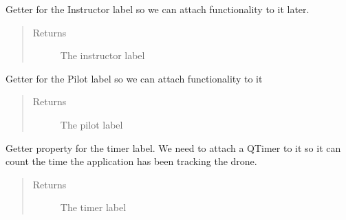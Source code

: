 \documentclass[letterpaper,10pt,english]{sphinxmanual}
\begin{document}
\begin{fulllineitems}
\begin{fulllineitems}
\begin{quote}
\begin{description}
\end{description}\end{quote}

\end{fulllineitems}


\begin{fulllineitems}
\label{\detokenize{index:src.Views.View_TrackingScreen.TrackingWindow.LblInstructor}}
Getter for the Instructor label so we can attach functionality to it later.
\begin{quote}\begin{description}
\item[{Returns}] \leavevmode
The instructor label

\end{description}\end{quote}

\end{fulllineitems}


\begin{fulllineitems}
\label{\detokenize{index:src.Views.View_TrackingScreen.TrackingWindow.LblPilot}}
Getter for the Pilot label so we can attach functionality to it
\begin{quote}\begin{description}
\item[{Returns}] \leavevmode
The pilot label

\end{description}\end{quote}

\end{fulllineitems}


\begin{fulllineitems}
\label{\detokenize{index:src.Views.View_TrackingScreen.TrackingWindow.LblTimer}}
Getter property for the timer label. We need to attach a QTimer to it so it can count the time the
application has been tracking the drone.
\begin{quote}\begin{description}
\item[{Returns}] \leavevmode
The timer label


\end{description}
\end{quote}
\end{fulllineitems}
\end{fulllineitems}
\end{document}
